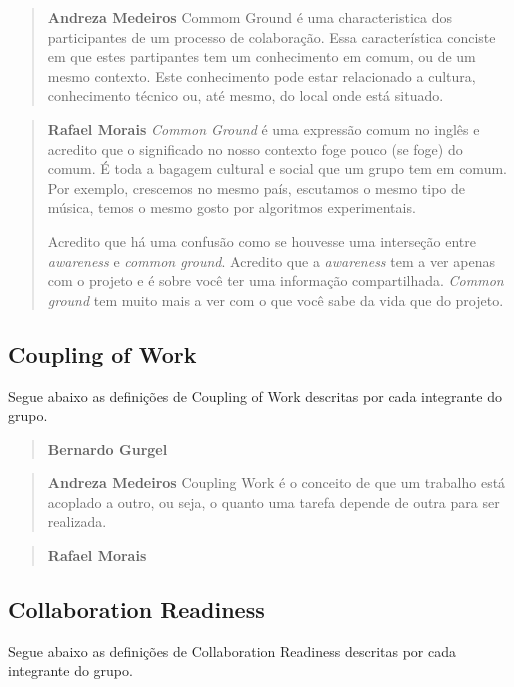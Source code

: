 \documentclass{acm_proc_article-sp}
\begin{document}
\begin{quote}\textbf{Andreza Medeiros}
Commom Ground é uma characteristica dos participantes de um processo de colaboração\cite{Olson:DM}. Essa característica conciste em que estes partipantes tem um conhecimento em comum, ou de um mesmo contexto. Este conhecimento pode estar relacionado a cultura, conhecimento técnico ou, até mesmo, do local onde está situado. 
\end{quote}

\begin{quote}\textbf{Rafael Morais}
  \textsl{Common Ground} é uma expressão comum no inglês e acredito que o significado no nosso contexto foge pouco (se foge) do comum.
  É toda a bagagem cultural e social que um grupo tem em comum. Por exemplo, crescemos no mesmo país, escutamos o mesmo tipo de música,
  temos o mesmo gosto por algoritmos experimentais.

  Acredito que há uma confusão como se houvesse uma interseção entre \textsl{awareness} e \textsl{common ground}. Acredito que a
  \textsl{awareness} tem a ver apenas com o projeto e é sobre você ter uma informação compartilhada. \textsl{Common ground} tem muito
  mais a ver com o que você sabe da vida que do projeto.
\end{quote}

\subsection{Coupling of Work}
Segue abaixo as definições de Coupling of Work descritas por cada integrante do grupo.

\begin{quote}\textbf{Bernardo Gurgel}

\end{quote}

\begin{quote}\textbf{Andreza Medeiros}
Coupling Work é o conceito de que um trabalho está acoplado a outro, ou seja, o quanto uma tarefa depende de outra para ser realizada. 
\end{quote}

\begin{quote}\textbf{Rafael Morais}
\end{quote}

\subsection{Collaboration Readiness}
Segue abaixo as definições de Collaboration Readiness descritas por cada integrante do grupo.
\end{document}
